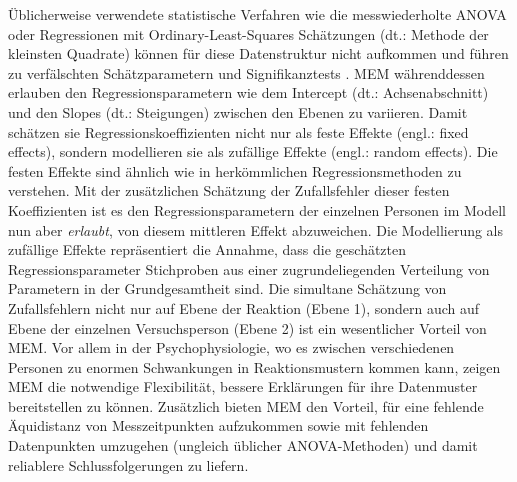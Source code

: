 		Üblicherweise verwendete statistische Verfahren wie die messwiederholte ANOVA oder Regressionen mit Ordinary-Least-Squares Schätzungen (dt.: Methode der kleinsten Quadrate) können für diese Datenstruktur nicht aufkommen und führen zu verfälschten Schätzparametern und Signifikanztests \parencite{NEZLEK2012}. 
		MEM währenddessen erlauben den Regressionsparametern wie dem Intercept (dt.: Achsenabschnitt) und den Slopes (dt.: Steigungen) zwischen den Ebenen zu variieren. Damit schätzen sie Regressionskoeffizienten nicht nur als feste Effekte (engl.: fixed effects), sondern modellieren sie als zufällige Effekte (engl.: random effects). Die festen Effekte sind ähnlich wie in herkömmlichen Regressionsmethoden zu verstehen.
		Mit der zusätzlichen Schätzung der Zufallsfehler dieser festen Koeffizienten ist es den Regressionsparametern der einzelnen Personen im Modell nun aber \textit{erlaubt}, von diesem mittleren Effekt abzuweichen. Die Modellierung als zufällige Effekte repräsentiert die Annahme, dass die geschätzten Regressionsparameter Stichproben aus einer zugrundeliegenden Verteilung von Parametern in der Grundgesamtheit sind.
		Die simultane Schätzung von Zufallsfehlern nicht nur auf Ebene der Reaktion (Ebene 1), sondern auch auf Ebene der einzelnen Versuchsperson (Ebene 2) ist ein wesentlicher Vorteil von MEM. Vor allem in der Psychophysiologie, wo es zwischen verschiedenen Personen zu enormen Schwankungen in Reaktionsmustern kommen kann, zeigen MEM die notwendige Flexibilität, bessere Erklärungen für ihre Datenmuster bereitstellen zu können.
		Zusätzlich bieten MEM den Vorteil, für eine fehlende Äquidistanz von Messzeitpunkten aufzukommen sowie mit fehlenden Datenpunkten umzugehen (ungleich üblicher ANOVA-Methoden) und damit reliablere Schlussfolgerungen zu liefern. 	
		
